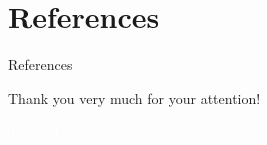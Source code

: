 \documentclass[aspectratio=169, 12pt]{beamer}    %
\begin{document}
\section{References}

\begin{frame}{References}

\end{frame}

\begin{sectionframe}

\begin{center}
{\Huge
\alert{
Thank you very much for your attention!
}
}
\end{center}
\end{sectionframe}


\begin{titleframe}
\begin{center}
{
\huge

\vspace{1cm}

\textcolor{white}{
The end
}
\vspace{1cm}

}
\end{center}
\end{titleframe}

\begin{titleframe}
\end{titleframe}
\end{document}

